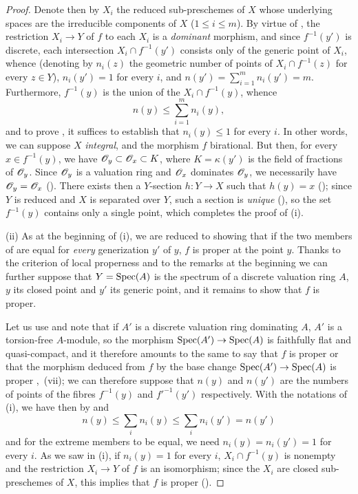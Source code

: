 \begin{proof}
Denote then by $X_i$ the reduced sub-preschemes of $X$ whose underlying spaces are the irreducible components of $X$ ($1\leq i\leq m$).
By virtue of , the restriction $X_i\to Y$ of $f$ to each $X_i$ is a \emph{dominant} morphism, and since $f^{-1}(y')$ is discrete, each intersection $X_i\cap f^{-1}(y')$ consists only of the generic point of $X_i$, whence (denoting by $n_i(z)$ the geometric number of points of $X_i\cap f^{-1}(z)$ for every $z\in Y$), $n_i(y')=1$ for every $i$, and $n(y')=\sum_{i=1}^{m} n_i(y')=m$.
Furthermore, $f^{-1}(y)$ is the union of the $X_i\cap f^{-1}(y)$, whence
\begin{equation}
\tag{15.5.2.3}
\label{IV.15.5.2.3}
  n(y) \leq \sum_{i=1}^{m} n_i(y),
\end{equation}
and to prove , it suffices to establish that $n_i(y)\leq 1$ for every $i$.
In other words, we can suppose $X$ \emph{integral}, and the morphism $f$ birational.
But then, for every $x\in f^{-1}(y)$, we have $\mathscr{O}_y\subset\mathscr{O}_x\subset K$, where $K=\kappa(y')$ is the field of fractions of $\mathscr{O}_y$.
Since $\mathscr{O}_y$ is a valuation ring and $\mathscr{O}_x$ dominates $\mathscr{O}_y$, we necessarily have $\mathscr{O}_y=\mathscr{O}_x$ ().
There exists then a $Y$-section $h:Y\to X$ such that $h(y)=x$ (); since $Y$ is reduced and $X$ is separated over $Y$, such a section is \emph{unique} (), so the set $f^{-1}(y)$ contains only a single point, which completes the proof of (i).

(ii)
As at the beginning of (i), we are reduced to showing that if the two members of  are equal for \emph{every} generization $y'$ of $y$, $f$ is proper at the point $y$.
Thanks to the criterion of local properness  and to the remarks at the beginning we can further suppose that $Y=\operatorname{Spec}(A)$ is the spectrum of a discrete valuation ring $A$, $y$ its closed point and $y'$ its generic point, and it remains to show that $f$ is proper.

Let us use  and note that if $A'$ is a discrete valuation ring dominating $A$, $A'$ is a torsion-free $A$-module, so the morphism $\operatorname{Spec}(A')\to\operatorname{Spec}(A)$ is faithfully flat and quasi-compact, and it therefore amounts to the same to say that $f$ is proper or that the morphism deduced from $f$ by the base change $\operatorname{Spec}(A')\to\operatorname{Spec}(A)$ is
proper ,~(vii); we can therefore suppose that $n(y)$ and $n(y')$ are the numbers of points of the fibres $f^{-1}(y)$ and $f'^{-1}(y')$ respectively.
With the notations of (i), we have then by  and 
\begin{equation}
\tag{15.5.2.4}
\label{IV.15.5.2.4}
  n(y) \leq \sum_i n_i(y) \leq \sum_i n_i(y') = n(y')
\end{equation}
and for the extreme members to be equal, we need $n_i(y)=n_i(y')=1$ for every $i$.
As we saw in (i), if $n_i(y)=1$ for every $i$, $X_i\cap f^{-1}(y)$ is nonempty and the restriction $X_i\to Y$ of $f$ is an isomorphism; since the $X_i$ are closed sub-preschemes of $X$, this implies that $f$ is proper ().


\end{proof}
